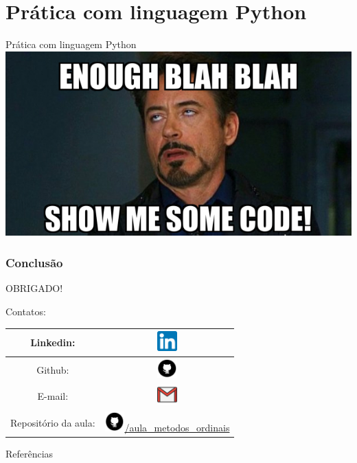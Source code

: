 \documentclass[aspectratio=169]{beamer}
\begin{document}
\section{Prática com linguagem Python}
\begin{frame}{Prática com linguagem Python}
    \centering
    \includegraphics[height=2.8in]{talkischeap.jpg}
\end{frame}

\begin{frame}
    \frametitle{Conclusão}
    \centering
        OBRIGADO!\\
        \begin{block}{}
            Contatos:
        \end{block}


    \begin{tabular}{cc}
        Linkedin: & \href{https://www.linkedin.com/in/alexandre-castro-45593415a/}{\includegraphics[height=0.3in]{linkedin.png}}\\
        \hline
        Github:  & \href{https://www.github.com/im-alexandre}{\includegraphics[height=0.3in]{github.png}}\\
        \hline
        E-mail:  &  \href{mailto:im.alexandre07@gmail.com}{\includegraphics[height=0.3in]{gmail.png}}\\
        \hline
        Repositório da aula:  &  \href{https://github.com/im-alexandre/aula_metodos_ordinais}{\includegraphics[height=0.3in]{github.png}/aula\_metodos\_ordinais}\\
        \hline
    \end{tabular}
\end{frame}

\begin{frame}{Referências}


\end{frame}
\end{document}
